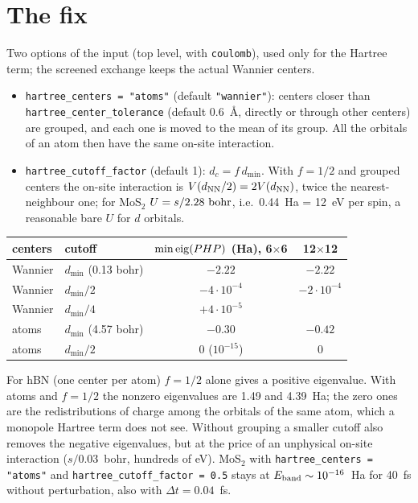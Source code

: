 \documentclass[11pt]{article}
\begin{document}
\section{The fix}

Two options of the input (top level, with \texttt{coulomb}), used only for the Hartree term; the screened exchange
keeps the actual Wannier centers.
\begin{itemize}
\item \texttt{hartree\_centers = "atoms"} (default \texttt{"wannier"}): centers closer than
      \texttt{hartree\_center\_tolerance} (default 0.6~\AA, directly or through other centers) are grouped, and each
      one is moved to the mean of its group. All the orbitals of an atom then have the same on-site interaction.
\item \texttt{hartree\_cutoff\_factor} (default 1): $d_c = f\,d_{\min}$. With $f = 1/2$ and grouped centers the on-site
      interaction is $V(d_{\rm NN}/2) = 2V(d_{\rm NN})$, twice the nearest-neighbour one; for MoS$_2$
      $U = s/2.28~{\rm bohr}$, i.e.\ 0.44~Ha = 12~eV per spin, a reasonable bare $U$ for $d$ orbitals.
\end{itemize}

\begin{center}
\begin{tabular}{llcc}
\toprule
centers & cutoff & $\min{\rm eig}(PHP)$ (Ha), 6$\times$6 & 12$\times$12\\
\midrule
Wannier & $d_{\min}$ (0.13 bohr) & $-2.22$ & $-2.22$\\
Wannier & $d_{\min}/2$ & $-4\cdot10^{-4}$ & $-2\cdot10^{-4}$\\
Wannier & $d_{\min}/4$ & $+4\cdot10^{-5}$ & \\
atoms & $d_{\min}$ (4.57 bohr) & $-0.30$ & $-0.42$\\
atoms & $d_{\min}/2$ & $0$ ($10^{-15}$) & $0$\\
\bottomrule
\end{tabular}
\end{center}

For hBN (one center per atom) $f = 1/2$ alone gives a positive eigenvalue. With atoms and $f = 1/2$ the nonzero eigenvalues are 1.49 and 4.39~Ha; the zero ones are the redistributions of charge
among the orbitals of the same atom, which a monopole Hartree term does not see. Without grouping a smaller cutoff
also removes the negative eigenvalues, but at the price of an unphysical on-site interaction ($s/0.03$~bohr, hundreds
of eV). MoS$_2$ with \texttt{hartree\_centers = "atoms"} and \texttt{hartree\_cutoff\_factor = 0.5} stays at
$E_{\rm band}\sim10^{-16}$~Ha for 40~fs without perturbation, also with $\Delta t = 0.04$~fs.
\end{document}
